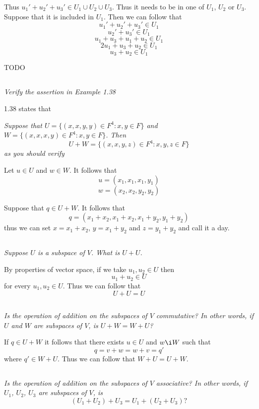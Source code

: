 \documentclass[10pt,oneside,titlepage]{book}
\begin{document}
Thus $u_1' + u_2' + u_3' \in U_1 \cup U_2 \cup U_3$. Thus it needs to
be in one of $U_1$, $U_2$ or $U_3$. Suppose that it is included in
$U_1$. Then we can follow that
$$u_1' + u_2' + u_3' \in U_1$$
$$u_2' + u_3' \in U_1$$
$$u_1 + u_3 + u_1 + u_2 \in U_1$$
$$2u_1 + u_3  + u_2 \in U_1$$
$$u_3  + u_2 \in U_1$$

TODO

\subsection{}
\textit{Verify the assertion in Example 1.38}

1.38 states that

\textit{Suppose that $U = \{(x, x, y, y) \in F^4: x, y \in F\}$ and
  $W = \{(x, x, x, y) \in F^4: x, y \in F\}$. Then }
$$U + W = \{(x, x, y, z) \in F^4: x, y, z \in F\}$$
\textit{as you should verify}

Let $u \in U$ and $w \in W$. It follows that
$$u = (x_1, x_1, x_1, y_1)$$
$$w = (x_2, x_2, y_2, y_2)$$

Suppose that $q \in U + W$.
It follows that
$$q = (x_1 + x_2, x_1 + x_2, x_1 + y_2, y_1 + y_2)$$
thus we can set $x = x_1 + x_2$, $y = x_1 + y_2$ and $z = y_1 + y_2$
and call it a day.

\subsection{}
\textit{Suppose $U$ is a subspace of $V$. What is $U + U$.}

By properties of vector space, if we take $u_1, u_2 \in U$ then
$$u_1 + u_2 \in U$$
for every $u_1, u_2 \in U$. Thus we can follow that
$$U + U = U$$

\subsection{}
\textit{Is the operation of addition on the subspaces of $V$ commutative? In
  other words, if $U$ and $W$ are subspaces of $V$, is $U + W = W + U$?}

If $q \in U + W$ it follows that there exists $u \in U$ and $w \i W$
such that
$$q = v + w = w + v = q'$$
where $q' \in W + U$. Thus we can follow that $W + U = U + W$.

\subsection{}

\textit{Is the operation of addition on the subspaces of $V$ associative? In
  other words, if $U_1$, $U_2$, $U_3$ are subspaces of $V$, is}
$$(U_1 + U_2) + U_3 = U_1 + (U_2 + U_3)?$$
\end{document}

